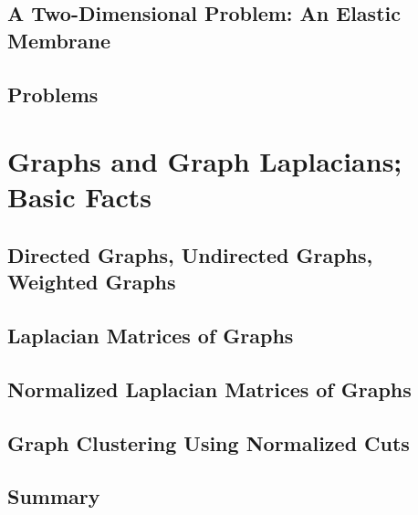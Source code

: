 \documentclass[a4paper]{article}
\begin{document}
\subsection{ A Two-Dimensional Problem: An Elastic Membrane} %

\subsection{ Problems} %


\newpage
\section{Graphs and Graph Laplacians; Basic Facts}
\subsection{ Directed Graphs, Undirected Graphs, Weighted Graphs} %

\subsection{ Laplacian Matrices of Graphs} %

\subsection{ Normalized Laplacian Matrices of Graphs} %

\subsection{ Graph Clustering Using Normalized Cuts} %

\subsection{ Summary} %
\end{document}
